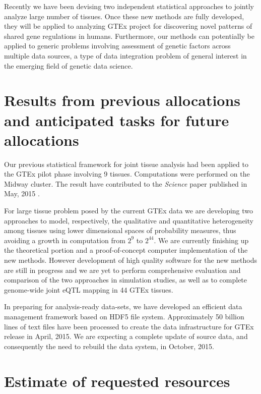\documentclass[10pt]{article}
\begin{document}
Recently we have been devising two independent statistical approaches to jointly analyze 
large number of tissues. 
Once these new methods are fully developed, they will be applied to analyzing GTEx project for discovering novel patterns of shared gene regulations in humans. 
Furthermore, our methods can potentially be applied to generic problems involving assessment of genetic factors across multiple data sources, a type of data integration problem of general interest in the emerging field of genetic data science.
 
\section*{Results from previous allocations and anticipated tasks for future
allocations}\label{results-from-previous-allocations}

Our previous statistical framework for joint tissue analysis had been applied to the GTEx pilot phase involving 9 tissues.
Computations were performed on the Midway cluster.
The result have contributed to the \textit{Science} paper published in May, 2015 \cite{Ardlie2015}. 

For large tissue problem posed by the current GTEx data we are developing two approaches to model, respectively, the qualitative and quantitative heterogeneity among tissues using lower dimensional spaces of probability measures, thus avoiding a growth in computation from $2^9$ to $2^{44}$. 
We are currently finishing up the theoretical portion and a proof-of-concept computer implementation of the new methods.
However development of high quality software for the new methods are still in progress and we are yet to perform comprehensive evaluation and comparison of the two approaches in simulation studies, as well as to complete genome-wide joint eQTL mapping in 44 GTEx tissues.

In preparing for analysis-ready data-sets, we have developed an efficient data management framework based on HDF5 file system. 
Approximately 50 billion lines of text files have been processed to create the data infrastructure for GTEx release in April, 2015. 
We are expecting a complete update of source data, and consequently the need to rebuild the data system, in October, 2015.

\section*{Estimate of requested
resources}\label{estimate-of-requested-resources}
\end{document}
